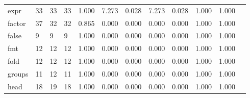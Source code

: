 \begin{longtable}{lp{1.00cm}p{1.00cm}p{1.00cm}p{1.00cm}p{1.00cm}p{1.00cm}p{1.00cm}p{1.00cm}p{1.00cm}p{1.00cm}p{1.00cm}}
expr      &                           33 &                 33 &                                33 &                                      1.000 &                                  7.273 &                                        0.028 &                             7.273 &                                   0.028 &                        1.000 &                                        1.000 \\
factor    &                           37 &                 32 &                                32 &                                      0.865 &                                  0.000 &                                        0.000 &                             0.000 &                                   0.000 &                        1.000 &                                        1.000 \\
false     &                            9 &                  9 &                                 9 &                                      1.000 &                                  0.000 &                                        0.000 &                             0.000 &                                   0.000 &                        1.000 &                                        1.000 \\
fmt       &                           12 &                 12 &                                12 &                                      1.000 &                                  0.000 &                                        0.000 &                             0.000 &                                   0.000 &                        1.000 &                                        1.000 \\
fold      &                           12 &                 12 &                                12 &                                      1.000 &                                  0.000 &                                        0.000 &                             0.000 &                                   0.000 &                        1.000 &                                        1.000 \\
groups    &                           11 &                 12 &                                11 &                                      1.000 &                                  0.000 &                                        0.000 &                             0.000 &                                   0.000 &                        1.000 &                                        1.000 \\
head      &                           18 &                 19 &                                18 &                                      1.000 &                                  0.000 &                                        0.000 &                             0.000 &                                   0.000 &                        1.000 &                                        1.000 \\

\end{longtable}
